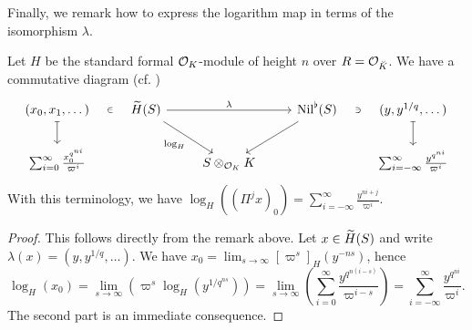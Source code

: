 \documentclass[../main.tex]{subfiles}
\begin{document}
Finally, we remark how to express the logarithm map in terms of the isomorphism
$\lambda$.


\begin{lem}\label{lem:LogInTermsOfNil}
  Let $H$ be the standard formal $\cO_K$-module of height $n$ over $R =
  \cO_{\breve K}$. We have a commutative diagram (cf. \cite[Lemma
  2.6.1]{BoyarchenkoWeinstein2011MaxVar})
  \begin{equation*}
  \begin{tikzcd}[ampersand replacement=\&]
  	{(x_0, x_1, \dots)} \& {\Tilde H(S)} \&\& {\Nil^\flat(S)} \& {(y,y^{1/q}, \dots)} \\
  	{\sum_{i=0}^\infty \frac{x_0^{q^{ni}}}{\varpi^i}} \&\& {S\otimes_{\cO_K}K} \&\& {\sum_{i = -\infty}^\infty\frac{y^{q^{ni}}}{\varpi^i}}
  	\arrow["\in"{description}, draw=none, from=1-1, to=1-2]
  	\arrow[maps to, from=1-1, to=2-1]
  	\arrow["\lambda", from=1-2, to=1-4]
  	\arrow["{\log_H}"', from=1-2, to=2-3]
  	\arrow[from=1-4, to=2-3]
  	\arrow["\ni"{description}, draw=none, from=1-5, to=1-4]
  	\arrow[maps to, from=1-5, to=2-5]
  \end{tikzcd}
  \end{equation*}
  With this terminology, we have $\log_H((\Pi^j x)_0) = \sum_{i = -\infty}^\infty
  \frac{ y^{ni + j}}{\varpi^i}$. 
\begin{proof}
  This follows directly from the remark above. Let $x \in \Tilde H(S)$ and write
  $\lambda(x) = (y, y^{1/q}, \dots)$. We have $x_0 = \lim_{s \to \infty}
  [\varpi^s]_H(y^{-ns})$, hence
  \begin{equation*}
    \log_H(x_0) = \lim_{s \to \infty}\left( \varpi^s \log_H(y^{1/q^{ns}})\right) = 
    \lim_{s \to \infty}\left( \sum_{i=0}^\infty  \frac{y^{q^{n(i-s)}}}{\varpi^{i-s}}\right)
    = \sum_{i=-\infty}^\infty \frac{y^{q^{ni}}}{\varpi^i}.
  \end{equation*}
  The second part is an immediate consequence.
\end{proof}
\end{lem}


\end{document}
